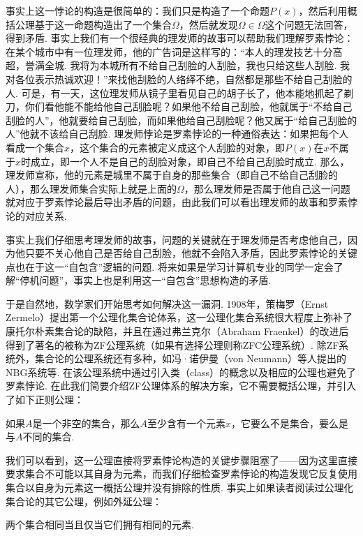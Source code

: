 事实上这一悖论的构造是很简单的：我们只是构造了一个命题$P(x)$，然后利用概括公理基于这一命题构造出了一个集合$\Omega$，然后就发现$\Omega\in\Omega$这个问题无法回答，得到矛盾. 事实上我们有一个很经典的理发师的故事可以帮助我们理解罗素悖论：在某个城市中有一位理发师，他的广告词是这样写的：“本人的理发技艺十分高超，誉满全城. 我将为本城所有不给自己刮脸的人刮脸，我也只给这些人刮脸. 我对各位表示热诚欢迎！”来找他刮脸的人络绎不绝，自然都是那些不给自己刮脸的人. 可是，有一天，这位理发师从镜子里看见自己的胡子长了，他本能地抓起了剃刀，你们看他能不能给他自己刮脸呢？如果他不给自己刮脸，他就属于``不给自己刮脸的人''，他就要给自己刮脸，而如果他给自己刮脸呢？他又属于``给自己刮脸的人''他就不该给自己刮脸. 理发师悖论是罗素悖论的一种通俗表达：如果把每个人看成一个集合$x$，这个集合的元素被定义成这个人刮脸的对象，即$P(x)$在$x$不属于$x$时成立，即一个人不是自己的刮脸对象，即自己不给自己刮脸时成立. 那么，理发师宣称，他的元素是城里不属于自身的那些集合（即自己不给自己刮脸的人），那么理发师集合实际上就是上面的$\Omega$，那么理发师是否属于他自己这一问题就对应于罗素悖论最后导出矛盾的问题，由此我们可以看出理发师的故事和罗素悖论的对应关系.

事实上我们仔细思考理发师的故事，问题的关键就在于理发师是否考虑他自己，因为他只要不关心他自己是否给自己刮脸，他就不会陷入矛盾，因此罗素悖论的关键点也在于这一``自包含''逻辑的问题. 将来如果是学习计算机专业的同学一定会了解``停机问题''，事实上也是利用这一``自包含''思想构造的矛盾.

于是自然地，数学家们开始思考如何解决这一漏洞. 1908年，策梅罗（Ernst Zermelo）提出第一个公理化集合论体系，这一公理化集合系统很大程度上弥补了康托尔朴素集合论的缺陷，并且在通过弗兰克尔（Abraham Fraenkel）的改进后得到了著名的被称为ZF公理系统（如果有选择公理则称ZFC公理系统）. 除ZF系统外，集合论的公理系统还有多种，如冯·诺伊曼（von Neumann）等人提出的NBG系统等. 在该公理系统中通过引入类（class）的概念以及相应的公理也避免了罗素悖论. 在此我们简要介绍ZF公理体系的解决方案，它不需要概括公理，并引入了如下正则公理：

\begin{axiom*}
    如果$A$是一个非空的集合，那么$A$至少含有一个元素$x$，它要么不是集合，要么是与$A$不同的集合.
\end{axiom*}

我们可以看到，这一公理直接将罗素悖论构造的关键步骤阻塞了——因为这里直接要求集合不可能以其自身为元素，而我们仔细检查罗素悖论的构造发现它反复使用集合以自身为元素这一概括公理并没有排除的性质. 事实上如果读者阅读过公理化集合论的其它公理，例如外延公理：

\begin{axiom*}
    两个集合相同当且仅当它们拥有相同的元素.
\end{axiom*}

